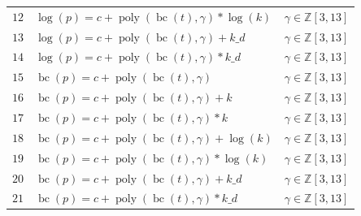\documentclass[12pt,a4paper]{article}
\DeclareMathOperator{\bc}{bc}
\DeclareMathOperator{\poly}{poly}
\begin{document}
\begin{table}
\begin{tabular}{rlc}
        $12$ & $\log(p) = c + \poly\left( \bc(t), \gamma \right) * \log(k) $ & $\gamma \in \mathbb{Z} \left[3, 13 \right]$\\
        $13$ & $\log(p) = c + \poly\left( \bc(t), \gamma \right) + k\_d $ & $\gamma \in \mathbb{Z} \left[3, 13 \right]$\\
        $14$ & $\log(p) = c + \poly\left( \bc(t), \gamma \right) * k\_d $ & $\gamma \in \mathbb{Z} \left[3, 13 \right]$\\   
        \midrule
        $15$ & $\bc(p) = c + \poly\left( \bc(t), \gamma \right) $ & $\gamma \in \mathbb{Z} \left[3, 13 \right]$\\ 
        $16$ & $\bc(p) = c + \poly\left( \bc(t), \gamma \right) + k $ & $\gamma \in \mathbb{Z} \left[3, 13 \right]$\\
        $17$ & $\bc(p) = c + \poly\left( \bc(t), \gamma \right) * k $ & $\gamma \in \mathbb{Z} \left[3, 13 \right]$\\
        $18$ & $\bc(p) = c + \poly\left( \bc(t), \gamma \right) + \log(k) $ & $\gamma \in \mathbb{Z} \left[3, 13 \right]$\\
        $19$ & $\bc(p) = c + \poly\left( \bc(t), \gamma \right) * \log(k) $ & $\gamma \in \mathbb{Z} \left[3, 13 \right]$\\
        $20$ & $\bc(p) = c + \poly\left( \bc(t), \gamma \right) + k\_d $ & $\gamma \in \mathbb{Z} \left[3, 13 \right]$\\
        $21$ & $\bc(p) = c + \poly\left( \bc(t), \gamma \right) * k\_d $ & $\gamma \in \mathbb{Z} \left[3, 13 \right]$\\    
        \bottomrule
    \end{tabular}
\end{table}
\end{document}
